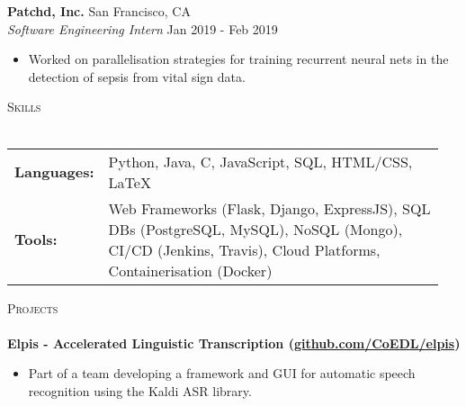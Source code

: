 \documentclass[a4paper]{article}
\newcommand{\lineunder} {
    \vspace*{-8pt} \\
    \hspace*{-10pt} \hrulefill \\
}
\newcommand{\header} [1] {
    {\hspace*{-10pt}\vspace*{6pt} \textsc{#1}}
    \vspace*{-6pt} \lineunder
}
\newenvironment{myitemize}
{   \small
    \vspace{-2pt}
    \begin{itemize}
    \setlength{\itemsep}{0pt}
    \setlength{\parskip}{0pt}
    \setlength{\parsep}{0pt}     }
{ \end{itemize}                  }
\newenvironment{singleitem}
{   \small
    \vspace{0pt}
    \begin{itemize}
    \setlength{\itemsep}{0pt}
    \setlength{\parskip}{0pt}
    \setlength{\parsep}{0pt}   }
{\end{itemize} \vspace{1pt}	}
\begin{document}
\textbf{Patchd, Inc.} \hfill San Francisco, CA\\
\textit{Software Engineering Intern} \hfill  Jan 2019 - Feb 2019\\
\begin{myitemize} \itemsep 0.5mm
	\item Worked on parallelisation strategies for training recurrent neural nets in the detection of sepsis from vital sign data.
\end{myitemize}

\vspace{0.5mm}
\header{Skills}
\vspace{1.5mm}
\begin{tabular}{p{0.12\linewidth}p{0.83\linewidth}}
	\textbf{Languages:} & Python, Java, C, JavaScript, SQL, HTML/CSS, \LaTeX \\
	\textbf{Tools:} & Web Frameworks (Flask, Django, ExpressJS), SQL DBs (PostgreSQL, MySQL), NoSQL (Mongo), CI/CD (Jenkins, Travis), Cloud Platforms, Containerisation (Docker)
\end{tabular}

\vspace{1.5mm}

\header{Projects}

\textbf{{Elpis - Accelerated Linguistic Transcription} (\href{https://github.com/CoEDL/elpis}{github.com/CoEDL/elpis})}
\begin{singleitem}
	\item Part of a team developing a framework and GUI for automatic speech recognition using the Kaldi ASR library.
\end{singleitem}
\end{document}
